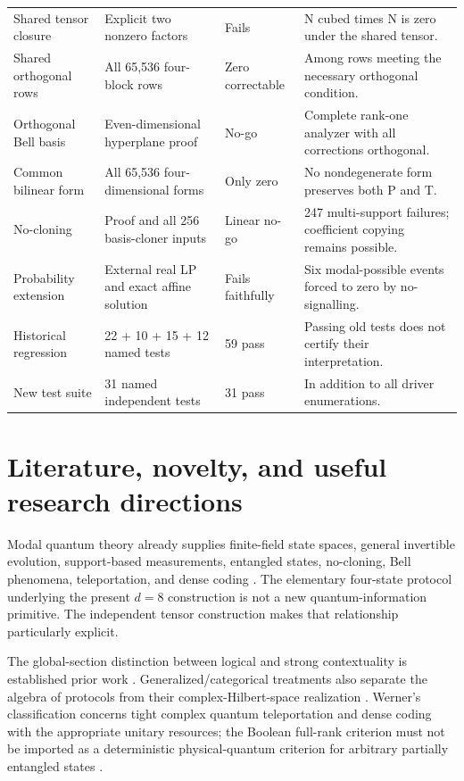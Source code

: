 \documentclass[11pt,a4paper]{article}
\theoremstyle{definition}\newtheorem{definition}[theorem]{Definition}
\begin{document}
\begin{longtable}{@{}L{29mm}L{53mm}L{21mm}L{45mm}@{}}
Shared tensor closure & Explicit two nonzero factors & Fails & N cubed times N is zero under the shared tensor.\\
Shared orthogonal rows & All 65,536 four-block rows & Zero correctable & Among rows meeting the necessary orthogonal condition.\\
Orthogonal Bell basis & Even-dimensional hyperplane proof & No-go & Complete rank-one analyzer with all corrections orthogonal.\\
Common bilinear form & All 65,536 four-dimensional forms & Only zero & No nondegenerate form preserves both P and T.\\
No-cloning & Proof and all 256 basis-cloner inputs & Linear no-go & 247 multi-support failures; coefficient copying remains possible.\\
Probability extension & External real LP and exact affine solution & Fails faithfully & Six modal-possible events forced to zero by no-signalling.\\
Historical regression & 22 + 10 + 15 + 12 named tests & 59 pass & Passing old tests does not certify their interpretation.\\
New test suite & 31 named independent tests & 31 pass & In addition to all driver enumerations.\\
\bottomrule\end{longtable}\normalsize


\section{Literature, novelty, and useful research directions}
Modal quantum theory already supplies finite-field state spaces, general invertible evolution, support-based measurements, entangled states, no-cloning, Bell phenomena, teleportation, and dense coding \cite{schumacher2011,james2011}. The elementary four-state protocol underlying the present $d=8$ construction is not a new quantum-information primitive. The independent tensor construction makes that relationship particularly explicit.

The global-section distinction between logical and strong contextuality is established prior work \cite{abramsky2011}. Generalized/categorical treatments also separate the algebra of protocols from their complex-Hilbert-space realization \cite{abramskycoecke2004}. Werner's classification concerns tight complex quantum teleportation and dense coding with the appropriate unitary resources; the Boolean full-rank criterion must not be imported as a deterministic physical-quantum criterion for arbitrary partially entangled states \cite{werner2001}.
\end{document}
